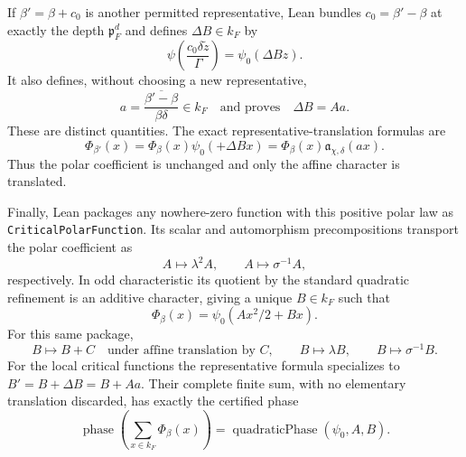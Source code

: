 \begin{lemma}
If $\beta'=\beta+c_0$ is another permitted representative, Lean bundles
$c_0=\beta'-\beta$ at exactly the depth $\mathfrak p_F^d$ and defines
$\Delta B\in k_F$ by
\[
 \psi\!\left(\frac{c_0\delta\widetilde z}{\Gamma}\right)
   =\psi_0(\Delta Bz).
\]
It also defines, without choosing a new representative,
\[
 a=\overline{\frac{\beta'-\beta}{\beta\delta}}\in k_F
 \quad\text{and proves}\quad
 \Delta B=Aa.
\]
These are distinct quantities.  The exact representative-translation
formulas are
\[
 \Phi_{\beta'}(x)=\Phi_\beta(x)\psi_0(+\Delta Bx)
 =\Phi_\beta(x)\mathfrak a_{\chi,\delta}(a x).
\]
Thus the polar coefficient is unchanged and only the affine character is
translated.

Finally, Lean packages any nowhere-zero function with this positive polar
law as \texttt{CriticalPolarFunction}.  Its scalar and automorphism
precompositions transport the polar coefficient as
\[
 A\longmapsto\lambda^2A,
 \qquad A\longmapsto\sigma^{-1}A,
\]
respectively.  In odd characteristic its quotient by the standard quadratic
refinement is an additive character, giving a unique $B\in k_F$ such that
\[
 \Phi_\beta(x)=\psi_0(Ax^2/2+Bx).
\]
For this same package,
\[
 B\longmapsto B+C\quad\text{under affine translation by }C,
 \qquad
 B\longmapsto\lambda B,
 \qquad
 B\longmapsto\sigma^{-1}B.
\]
For the local critical functions the representative formula specializes to
$B'=B+\Delta B=B+Aa$.  Their complete finite sum, with no elementary
translation discarded, has exactly the certified phase
\[
 \operatorname{phase}\!\left(\sum_{x\in k_F}\Phi_\beta(x)\right)
 =\operatorname{quadraticPhase}(\psi_0,A,B).
\]

\end{lemma}
